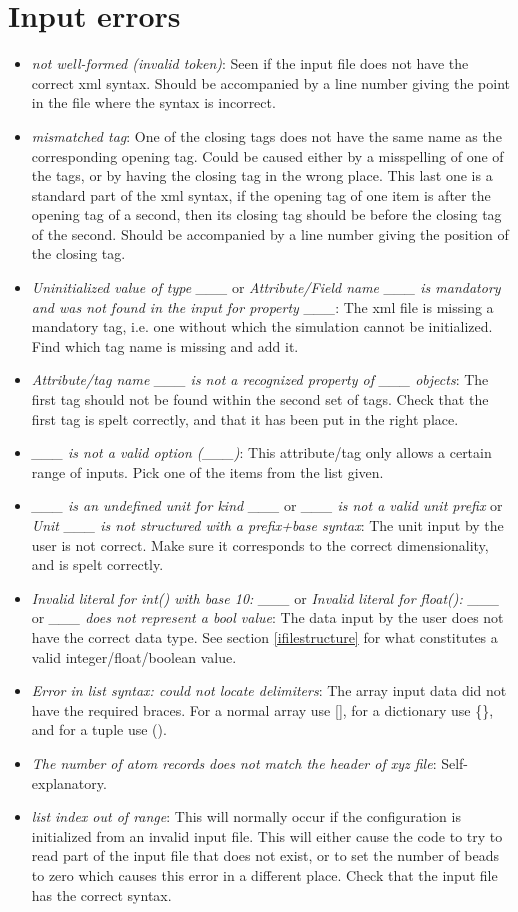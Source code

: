 \documentclass[11pt,english,fleqn]{report}
\begin{document}
\section{Input errors}
\begin{itemize}
\item \emph{not well-formed (invalid token)}: Seen if the input file does
not have the correct xml syntax. Should be accompanied by a line number
giving the point in the file where the syntax is incorrect.
\item \emph{mismatched tag}: One of the closing tags does not have the
same name as the corresponding opening tag. Could be caused either
by a misspelling of one of the tags, or by having the closing tag
in the wrong place. This last one is a standard part of the xml syntax,
if the opening tag of one item is after the opening tag of a second,
then its closing tag should be before the closing tag of the second.
Should be accompanied by a line number giving the position of the
closing tag.
\item \emph{Uninitialized value of type \_\_\_} or \emph{Attribute/Field name \_\_\_ is mandatory and was not found in the input for property \_\_\_}:
The xml file is missing a mandatory tag, i.e. one without which the
simulation cannot be initialized. Find which tag name is missing and
add it.
\item \emph{Attribute/tag name \_\_\_ is not a recognized property of \_\_\_ objects}:
The first tag should not be found within the second set of tags. Check
that the first tag is spelt correctly, and that it has been put in
the right place.
\item \emph{\_\_\_ is not a valid option (\_\_\_)}: This attribute/tag
only allows a certain range of inputs. Pick one of the items from
the list given.
\item \emph{\_\_\_ is an undefined unit for kind \_\_\_} or \emph{\_\_\_ is not a valid unit prefix} or \emph{Unit \_\_\_ is not structured with a prefix+base syntax}:
The unit input by the user is not correct. Make sure it corresponds
to the correct dimensionality, and is spelt correctly.
\item \emph{Invalid literal for int() with base 10: \_\_\_} or \emph{Invalid literal for float(): \_\_\_} or \emph{\_\_\_ does not represent a bool value}:
The data input by the user does not have the correct data type. See
section \ref{ifilestructure} for what constitutes a valid integer/float/boolean
value.
\item \emph{Error in list syntax: could not locate delimiters}: The array
input data did not have the required braces. For a normal array use
{[}{]}, for a dictionary use \{\}, and for a tuple use ().
\item \emph{The number of atom records does not match the header of xyz file}:
Self-explanatory.
\item \emph{list index out of range}: This will normally occur if the configuration
is initialized from an invalid input file. This will either cause
the code to try to read part of the input file that does not exist,
or to set the number of beads to zero which causes this error in a
different place. Check that the input file has the correct syntax.
\end{itemize}
\end{document}
